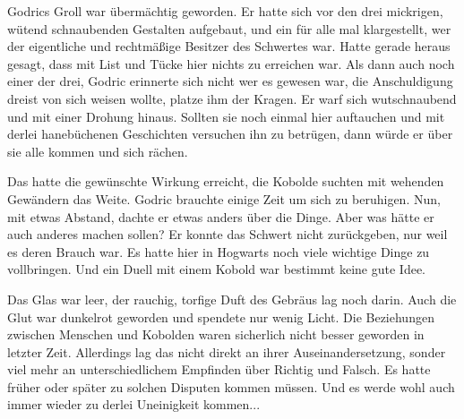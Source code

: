 \documentclass[fontsize=12pt]{scrartcl}
\begin{document}
	Godrics Groll war übermächtig geworden. Er hatte sich vor den drei mickrigen, wütend schnaubenden Gestalten aufgebaut, und ein für alle mal klargestellt, wer der eigentliche und rechtmäßige Besitzer des Schwertes war. Hatte gerade heraus gesagt, dass mit List und Tücke hier nichts zu erreichen war. Als dann auch noch einer der drei, Godric erinnerte sich nicht wer es gewesen war, die Anschuldigung dreist von sich weisen wollte, platze ihm der Kragen. Er warf sich wutschnaubend und mit einer Drohung hinaus. Sollten sie noch einmal hier auftauchen und mit derlei hanebüchenen Geschichten versuchen ihn zu betrügen, dann würde er über sie alle kommen und sich rächen. 
	
	Das hatte die gewünschte Wirkung erreicht, die Kobolde suchten mit wehenden Gewändern das Weite. Godric brauchte einige Zeit um sich zu beruhigen. Nun, mit etwas Abstand, dachte er etwas anders über die Dinge. Aber was hätte er auch anderes machen sollen? Er konnte das Schwert nicht zurückgeben, nur weil es deren Brauch war. Es hatte hier in Hogwarts noch viele wichtige Dinge zu vollbringen. Und ein Duell mit einem Kobold war bestimmt keine gute Idee. 
	
	Das Glas war leer, der rauchig, torfige Duft des Gebräus lag noch darin. Auch die Glut war dunkelrot geworden und spendete nur wenig Licht. Die Beziehungen zwischen Menschen und Kobolden waren sicherlich nicht besser geworden in letzter Zeit. Allerdings lag das nicht direkt an ihrer Auseinandersetzung, sonder viel mehr an unterschiedlichem Empfinden über Richtig und Falsch. Es hatte früher oder später zu solchen Disputen kommen müssen. Und es werde wohl auch immer wieder zu derlei Uneinigkeit kommen...
	
	
\end{document}

